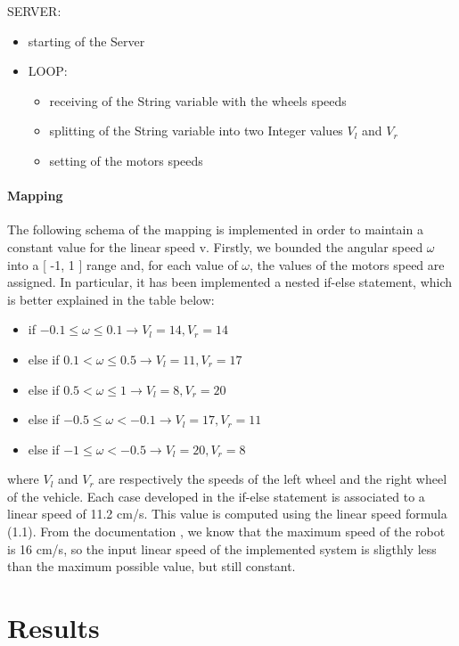 \documentclass[a4paper,11pt,oneside]{book}
\begin{document}
SERVER:
\begin{itemize}
\item starting of the Server
\item LOOP:
\begin{itemize}
\item receiving of the String variable with the wheels speeds
\item splitting of the String variable into two Integer values $V_l$ and $V_r$
\item setting of the motors speeds
\end{itemize}
\end{itemize}

\subsubsection{Mapping}
The following schema of the mapping is implemented in order to maintain a constant value for the linear speed v. Firstly, we bounded the angular speed $\omega$ into a [ -1, 1 ] range and, for each value of $\omega$, the values of the motors speed are assigned. In particular, it has been implemented a nested if-else statement, which is better explained in the table below:
\begin{itemize}
\item if $-0.1 \leq \omega \leq 0.1 \rightarrow V_l = 14, V_r = 14$
\item else if $0.1 < \omega \leq 0.5 \rightarrow V_l = 11, V_r = 17$
\item else if $0.5 < \omega \leq 1 \rightarrow V_l = 8, V_r = 20$
\item else if $-0.5 \leq \omega < -0.1 \rightarrow V_l = 17, V_r = 11$
\item else if $-1 \leq \omega < -0.5 \rightarrow V_l = 20, V_r = 8$
\end{itemize}
where $V_l$ and $V_r$ are respectively the speeds of the left wheel and the right wheel of the vehicle.
Each case developed in the if-else statement is associated to a linear speed of 11.2 cm/s. This value is computed using the linear speed formula (1.1).
From the documentation \cite{MR-GB:44}, we know that the maximum speed of the robot is 16 cm/s, so the input linear speed of the implemented system is sligthly less than the maximum possible value, but still constant.

\chapter{Results}
\end{document}
